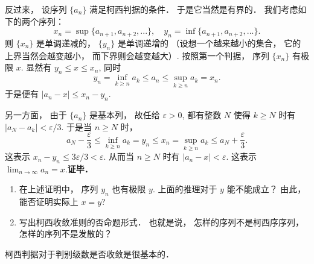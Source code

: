 反过来， 设序列 $\{a_n\}$ 满足柯西判据的条件． 于是它当然是有界的． 我们考虑如下的两个序列：
$$
x_n=\sup\{a_{n+1},a_{n+2},...\},
\quad
y_n=\inf\{a_{n+1},a_{n+2},...\}.
$$
则 $\{x_n\}$ 是单调递减的， $\{y_n\}$ 是单调递增的 （设想一个越来越小的集合， 它的上界当然会越变越小， 而下界则会越变越大）. 按照第一个判据， 序列 $\{x_n\}$ 有极限 $x$. 显然有 $y_n\leq x\leq x_n$, 同时
$$
y_n=\inf_{k\geq n}a_k\leq a_n\leq \sup_{k\geq n}a_k=x_n.
$$
于是便有 $|a_n-x|\leq x_n-y_n$. 

另一方面， 由于 $\{a_n\}$ 是基本列， 故任给 $\varepsilon>0$, 都有整数 $N$ 使得 $k\geq N$ 时有 $|a_N-a_k|<\varepsilon/3$. 于是当 $n\geq N$ 时，
$$
a_N-\frac{\varepsilon}{3}\leq \inf_{k\geq n}a_k=y_n
\leq x_n=\sup_{k\geq n}a_k\leq a_N+\frac{\varepsilon}{3}.
$$
这表示 $x_n-y_n\leq 3\varepsilon/3<\varepsilon$. 从而当 $n\geq N$ 时有 $|a_n-x|<\varepsilon$. 这表示 $\lim_{n\to\infty}a_n=x$.\textbf{证毕．}

\begin{exercise}{}
\begin{enumerate}
\item 在上述证明中， 序列 $y_n$ 也有极限 $y$. 上面的推理对于 $y$ 能不能成立？ 由此， 能否证明实际上 $x=y$?
\item 写出柯西收敛准则的否命题形式． 也就是说， 怎样的序列不是柯西序序列， 怎样的序列不是发散的？
\end{enumerate}
\end{exercise}

柯西判据对于判别级数是否收敛是很基本的．
